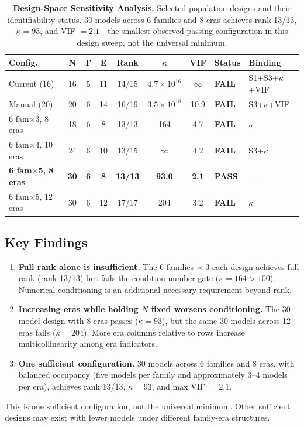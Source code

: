 \documentclass{ieeeaccess}
\theoremstyle{definition}
\theoremstyle{plain}
\begin{document}
\begin{table}[!t]
\caption{\textbf{Design-Space Sensitivity Analysis.} Selected population designs and their identifiability status. 30 models across 6 families and 8 eras achieves rank 13/13, $\kappa = 93$, and VIF $= 2.1$---the smallest observed passing configuration in this design sweep, not the universal minimum.}
\label{tab:design_sweep}
\centering
\footnotesize
\begin{tabular}{l c c c c c c l l}
\hline
\textbf{Config.} & \textbf{N} & \textbf{F} & \textbf{E} & \textbf{Rank} & $\boldsymbol{\kappa}$ & \textbf{VIF} & \textbf{Status} & \textbf{Binding} \\
\hline
Current (16) & 16 & 5 & 11 & 14/15 & $4.7\!\times\!10^{16}$ & $\infty$ & \textbf{FAIL} & S1+S3+$\kappa$+VIF \\
\hline
Manual (20) & 20 & 6 & 14 & 16/19 & $3.5\!\times\!10^{18}$ & 10.9 & \textbf{FAIL} & S3+$\kappa$+VIF \\
\hline
6 fam$\times$3, 8 eras & 18 & 6 & 8 & 13/13 & 164 & 4.7 & \textbf{FAIL} & $\kappa$ \\
\hline
6 fam$\times$4, 10 eras & 24 & 6 & 10 & 13/15 & $\infty$ & 4.2 & \textbf{FAIL} & S3+$\kappa$ \\
\hline
\textbf{6 fam$\times$5, 8 eras} & \textbf{30} & \textbf{6} & \textbf{8} & \textbf{13/13} & \textbf{93.0} & \textbf{2.1} & \textbf{PASS} & --- \\
\hline
6 fam$\times$5, 12 eras & 30 & 6 & 12 & 17/17 & 204 & 3.2 & \textbf{FAIL} & $\kappa$ \\
\hline
\end{tabular}
\end{table}

\subsection{Key Findings}
\begin{enumerate}
\item \textbf{Full rank alone is insufficient.} The 6-families $\times$ 3-each design achieves full rank (rank 13/13) but fails the condition number gate ($\kappa = 164 > 100$). Numerical conditioning is an additional necessary requirement beyond rank.
\item \textbf{Increasing eras while holding $N$ fixed worsens conditioning.} The 30-model design with 8 eras passes ($\kappa = 93$), but the same 30 models across 12 eras fails ($\kappa = 204$). More era columns relative to rows increase multicollinearity among era indicators.
\item \textbf{One sufficient configuration.} 30 models across 6 families and 8 eras, with balanced occupancy (five models per family and approximately 3--4 models per era), achieves rank 13/13, $\kappa = 93$, and max VIF $= 2.1$.
\end{enumerate}
This is one sufficient configuration, not the universal minimum. Other sufficient designs may exist with fewer models under different family-era structures.
\end{document}
